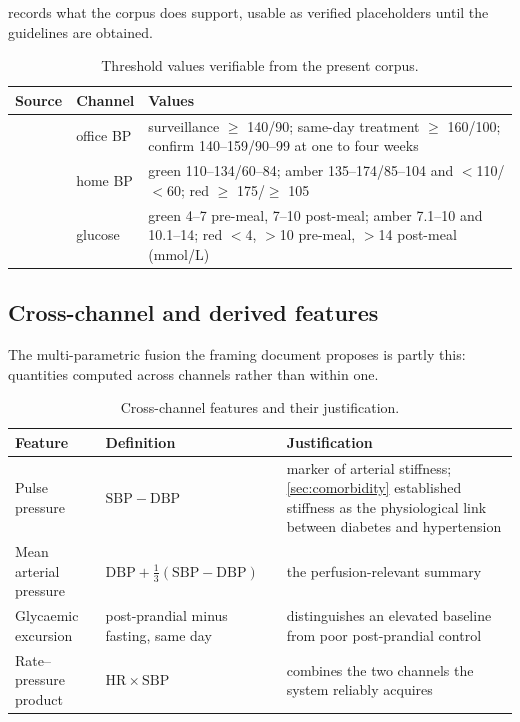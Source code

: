 \documentclass[12pt,a4paper,oneside]{report}
\begin{document}
 records what the corpus does support, usable as verified placeholders until the guidelines are obtained.

\begin{table}[htbp]
\centering\footnotesize
\caption{Threshold values verifiable from the present corpus.}\label{tab:verified-thresholds}
\begin{tabularx}{\textwidth}{@{}>{\raggedright\arraybackslash}p{2.9cm} >{\raggedright\arraybackslash}p{2.0cm} X@{}}
\toprule
\textbf{Source} & \textbf{Channel} & \textbf{Values} \\
\midrule
\textcite{who2023hypertension} & office BP & surveillance $\geq$ 140/90; same-day treatment $\geq$ 160/100; confirm 140--159/90--99 at one to four weeks \\
\textcite{mihevc2025} & home BP & green 110--134/60--84; amber 135--174/85--104 and $<$110/$<$60; red $\geq$ 175/$\geq$ 105 \\
\textcite{mihevc2025} & glucose & green 4--7 pre-meal, 7--10 post-meal; amber 7.1--10 and 10.1--14; red $<$4, $>$10 pre-meal, $>$14 post-meal (mmol/L) \\
\bottomrule
\end{tabularx}
\end{table}

\subsection{Cross-channel and derived features}\label{sec:cross-channel}

The multi-parametric fusion the framing document proposes is partly this: quantities computed across channels rather than within one.

\begin{table}[htbp]
\centering\footnotesize
\caption{Cross-channel features and their justification.}\label{tab:cross-features}
\begin{tabularx}{\textwidth}{@{}>{\raggedright\arraybackslash}p{3.3cm} >{\raggedright\arraybackslash}p{3.3cm} X@{}}
\toprule
\textbf{Feature} & \textbf{Definition} & \textbf{Justification} \\
\midrule
Pulse pressure & $\mathrm{SBP} - \mathrm{DBP}$ & marker of arterial stiffness; \cref{sec:comorbidity} established stiffness as the physiological link between diabetes and hypertension \\
Mean arterial pressure & $\mathrm{DBP} + \tfrac{1}{3}(\mathrm{SBP}-\mathrm{DBP})$ & the perfusion-relevant summary \\
Glycaemic excursion & post-prandial minus fasting, same day & distinguishes an elevated baseline from poor post-prandial control \\
Rate--pressure product & $\mathrm{HR} \times \mathrm{SBP}$ & combines the two channels the system reliably acquires \\
\bottomrule
\end{tabularx}
\end{table}
\end{document}
